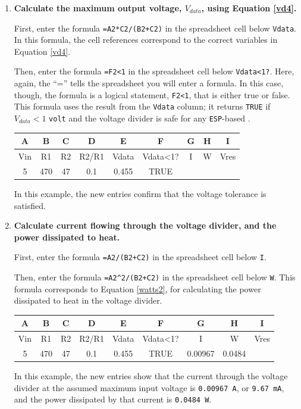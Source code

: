 \begin{enumerate}
	\item \textbf{Calculate the maximum output voltage, $V_{data}$, using Equation \ref{vd4}.}

	First, enter the formula \lstinline{=A2*C2/(B2+C2)} in the spreadsheet cell below \texttt{Vdata}.
	In this formula, the cell references correspond to the correct variables in Equation \ref{vd4}.

	Then, enter the formula \lstinline{=F2<1} in the spreadsheet cell below \texttt{Vdata<1?}.
	Here, again, the  ``='' tells the spreadsheet you will enter a formula.
	In this case, though, the formula is a logical statement, \lstinline{F2<1}, that is either true or false.
	This formula uses the result from the \texttt{Vdata} column; it returns \texttt{TRUE} if $V_{data} < 1$ \texttt{volt} and the voltage divider is safe for any \texttt{ESP}-based \adc.
	\begin{table}[H]
	\centering \begin{small}
	\begin{tabular}{|c|c|c|c|c|c|c|c|c|}
		\hline
		\textbf{A}  & \textbf{B} & \textbf{C} & \textbf{D} & \textbf{E} & \textbf{F} & \textbf{G} & \textbf{H} & \textbf{I} \\
		\hline
		Vin  & R1 & R2 & R2/R1 & Vdata & Vdata<1? & I & W & Vres \\
		\hline
		5 & 470  & 47 & 0.1 & 0.455 & TRUE &  &  &  \\
		\hline
	\end{tabular}
	\end{small}
	\end{table}
	In this example, the new entries confirm that the voltage tolerance is satisfied.

	\item \textbf{Calculate current flowing through the voltage divider, and the power dissipated to heat.}

	First, enter the formula \lstinline{=A2/(B2+C2)} in the spreadsheet cell below \texttt{I}.

	Then, enter the formula \lstinline{=A2^2/(B2+C2)} in the spreadsheet cell below \texttt{W}.
	This formula corresponds to Equation \ref{watts2}, for calculating the power dissipated to heat in the voltage divider.
	\begin{table}[H]
	\centering \begin{small}
	\begin{tabular}{|c|c|c|c|c|c|c|c|c|}
		\hline
		\textbf{A}  & \textbf{B} & \textbf{C} & \textbf{D} & \textbf{E} & \textbf{F} & \textbf{G} & \textbf{H} & \textbf{I} \\
		\hline
		Vin  & R1 & R2 & R2/R1 & Vdata & Vdata<1? & I & W & Vres \\
		\hline
		5 & 470  & 47 & 0.1 & 0.455 & TRUE & 0.00967 & 0.0484 &  \\
		\hline
	\end{tabular}
	\end{small}
	\end{table}
	In this example, the new entries show that the current through the voltage divider at the assumed maximum input voltage is \texttt{0.00967 A}, or \texttt{9.67 mA}, and the power dissipated by that current is \texttt{0.0484 W}.


\end{enumerate}
